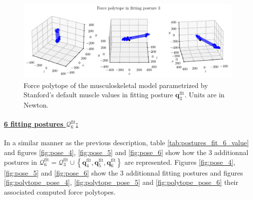 \begin{figure}[!htb]
    \centering
    \captionsetup{justification=centering}
    \begin{minipage}{\linewidth}
        \centering
        \includegraphics[trim={0 0 0 0}, clip, width=1\linewidth]{img/chapter_4/reconstruction_stanford_imgs/STANFORD_POSTURE_FITTING_03.pdf}
    \end{minipage}
    \caption{Force polytope of the musculoskeletal model parametrized by Stanford's default muscle values in fitting posture $\mathbf{q}_3^{\text{fit}}$. Units are in Newton.}
    \label{fig:polytope_pose_3}
\end{figure}

\clearpage
\paragraph*{\underline{6 fitting postures $\mathcal{Q}_6^{\text{fit}}$:}}
In a similar manner as the previous description, table \ref{tab:postures_fit_6_value} and figures \ref{fig:pose_4}, \ref{fig:pose_5} and \ref{fig:pose_6} show how the 3 additionnal postures in $\mathcal{Q}_6^{\text{fit}} = \mathcal{Q}_3^{\text{fit}} \cup \left\{\mathbf{q}_4^{\text{fit}}, \mathbf{q}_5^{\text{fit}}, \mathbf{q}_6^{\text{fit}}\right\}$ are represented. Figures \ref{fig:pose_4}, \ref{fig:pose_5} and \ref{fig:pose_6} show the 3 additionnal fitting postures and figures \ref{fig:polytope_pose_4}, \ref{fig:polytope_pose_5} and \ref{fig:polytope_pose_6} their associated computed force polytopes.

